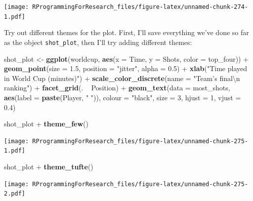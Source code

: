 \documentclass[]{book}
\makeatletter
\newenvironment{Shaded}{\begin{snugshade}}{\end{snugshade}}
\newcommand{\KeywordTok}[1]{\textcolor[rgb]{0.13,0.29,0.53}{\textbf{{#1}}}}
\newcommand{\DataTypeTok}[1]{\textcolor[rgb]{0.13,0.29,0.53}{{#1}}}
\newcommand{\DecValTok}[1]{\textcolor[rgb]{0.00,0.00,0.81}{{#1}}}
\newcommand{\FloatTok}[1]{\textcolor[rgb]{0.00,0.00,0.81}{{#1}}}
\newcommand{\CharTok}[1]{\textcolor[rgb]{0.31,0.60,0.02}{{#1}}}
\newcommand{\StringTok}[1]{\textcolor[rgb]{0.31,0.60,0.02}{{#1}}}
\newcommand{\NormalTok}[1]{{#1}}
\newenvironment{kframe}{%
\medskip{}
\setlength{\fboxsep}{.8em}
 \def\at@end@of@kframe{}%
 \ifinner\ifhmode%
  \def\at@end@of@kframe{\end{minipage}}%
  \begin{minipage}{\columnwidth}%
 \fi\fi%
 \def\FrameCommand##1{\hskip\@totalleftmargin \hskip-\fboxsep
 \colorbox{shadecolor}{##1}\hskip-\fboxsep
     \hskip-\linewidth \hskip-\@totalleftmargin \hskip\columnwidth}%
 \MakeFramed {\advance\hsize-\width
   \@totalleftmargin\z@ \linewidth\hsize
   \@setminipage}}%
 {\par\unskip\endMakeFramed%
 \at@end@of@kframe}
\renewenvironment{Shaded}{\begin{kframe}}{\end{kframe}}
\makeatother
\begin{document}
\texttt{[image: RProgrammingForResearch\_files/figure-latex/unnamed-chunk-274-1.pdf]}

Try out different themes for the plot. First, I'll save everything we've
done so far as the object \texttt{shot\_plot}, then I'll try adding
different themes:

\begin{Shaded}
\begin{Highlighting}[]
\NormalTok{shot_plot <-}\StringTok{ }\KeywordTok{ggplot}\NormalTok{(worldcup, }\KeywordTok{aes}\NormalTok{(}\DataTypeTok{x =} \NormalTok{Time, }\DataTypeTok{y =} \NormalTok{Shots,}
                     \DataTypeTok{color =} \NormalTok{top_four)) +}
\StringTok{        }\KeywordTok{geom_point}\NormalTok{(}\DataTypeTok{size =} \FloatTok{1.5}\NormalTok{, }\DataTypeTok{position =} \StringTok{"jitter"}\NormalTok{,}
                   \DataTypeTok{alpha =} \FloatTok{0.5}\NormalTok{)  +}\StringTok{ }
\StringTok{        }\KeywordTok{xlab}\NormalTok{(}\StringTok{"Time played in World Cup (minutes)"}\NormalTok{) +}\StringTok{ }
\StringTok{        }\KeywordTok{scale_color_discrete}\NormalTok{(}\DataTypeTok{name =} \StringTok{"Team's final}\CharTok{\textbackslash{}n}\StringTok{ ranking"}\NormalTok{) +}\StringTok{ }
\StringTok{        }\KeywordTok{facet_grid}\NormalTok{(. ~}\StringTok{ }\NormalTok{Position) +}\StringTok{ }
\StringTok{        }\KeywordTok{geom_text}\NormalTok{(}\DataTypeTok{data =} \NormalTok{most_shots,}
                  \KeywordTok{aes}\NormalTok{(}\DataTypeTok{label =} \KeywordTok{paste}\NormalTok{(Player, }\StringTok{" "}\NormalTok{)),}
                  \DataTypeTok{colour =} \StringTok{"black"}\NormalTok{, }\DataTypeTok{size =} \DecValTok{3}\NormalTok{,}
                  \DataTypeTok{hjust =} \DecValTok{1}\NormalTok{, }\DataTypeTok{vjust =} \FloatTok{0.4}\NormalTok{)}

\NormalTok{shot_plot +}\StringTok{ }\KeywordTok{theme_few}\NormalTok{()}
\end{Highlighting}
\end{Shaded}

\texttt{[image: RProgrammingForResearch\_files/figure-latex/unnamed-chunk-275-1.pdf]}

\begin{Shaded}
\begin{Highlighting}[]
\NormalTok{shot_plot +}\StringTok{ }\KeywordTok{theme_tufte}\NormalTok{()}
\end{Highlighting}
\end{Shaded}

\texttt{[image: RProgrammingForResearch\_files/figure-latex/unnamed-chunk-275-2.pdf]}
\end{document}
